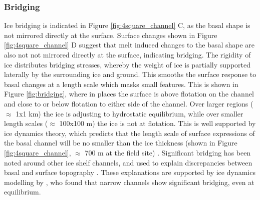 \subsubsection{Bridging} \label{sec:bridging}

Ice bridging is indicated in Figure \ref{fig:4square_channel} C, as the basal shape is not mirrored directly at the surface. Surface changes shown in Figure \ref{fig:4square_channel} D suggest that melt induced changes to the basal shape are also not not mirrored directly at the surface, indicating bridging. The rigidity of ice distributes bridging stresses, whereby the weight of ice is partially supported laterally by the surrounding ice and ground. This smooths the surface response to basal changes at a length scale which masks small features. 
This is shown in Figure \ref{fig:bridging}, where in places the surface is above flotation on the channel and close to or below flotation to either side of the channel. Over larger regions ($\approx$ 1x1 km) the ice is adjusting to hydrostatic equilibrium, while over smaller length scales ($\approx$ 100x100 m) the ice is not at flotation. 
This is well supported by ice dynamics theory, which predicts that the length scale of surface expressions of the basal channel will be no smaller than the ice thickness  (shown in Figure \ref{fig:4square_channel}, $\approx$ 700 m at the field site) \cite [e.g.][] {gudmundsson2008limit}.
Significant bridging has been noted around other ice shelf channels, and used to explain discrepancies between basal and surface topography \cite [e.g.][] {dutrieux2013pine,chartrand2020basal,vaughan2012subglacial}. These explanations are supported by ice dynamics modelling by \cite{drews2015evolution}, who found that narrow channels show significant bridging, even at equilibrium. 


